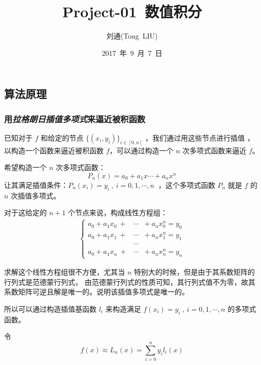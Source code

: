 \documentclass[UTF8, 11pt, a4paper]{ctexart}
\begin{document}
\begin{spacing}{1.5}%

\title{  Project-01~数值积分 } %
\author{刘通(Tong~LIU)} %
\date{2017~年~9~月~7~日} %
\maketitle %
\tableofcontents %
\newpage
\part{算法原理}
\section{用\emph{拉格朗日插值多项式}来逼近被积函数}
已知对于 $ f $ 和给定的节点 $ \{ (x_i,y_i) \}_{i \in [0,n] } $ ，我们通过用这些节点进行插值
，以构造一个函数来逼近被积函数 $ f $，可以通过构造一个 $ n $ 次多项式函数来逼近 $ f $。

希望构造一个 $ n $ 次多项式函数：
$$ P_{n}(x) = a_0 + a_1 x \cdots + a_n x^n  $$
让其满足插值条件：$ P_{n}(x_i) = y_i~,~i=0,1,\cdots,n~$ ，这个多项式函数 $ P_{n} $ 就是
$ f $ 的 $ n $ 次插值多项式。

对于这给定的 $ n+1 $ 个节点来说，构成线性方程组：
\begin{align*}
  \left\{
  \begin{array}{rcl}
a_0 + a_1 x_0 ~+ & \cdots & + ~a_n x_0^n = y_0 \\
a_0 + a_1 x_1 ~+ & \cdots & + ~a_n x_1^n = y_1 \\
                & \cdots & \\
a_0 + a_1 x_n ~+ & \cdots & + ~a_n x_n^n = y_n
  \end{array} \right.
\end{align*}

求解这个线性方程组很不方便，尤其当 $n$ 特别大的时候，但是由于其系数矩阵的行列式是范德蒙行列式，
由范德蒙行列式的性质可知，其行列式值不为零，故其系数矩阵可逆且解是唯一的。说明该插值多项式是唯一的。

所以可以通过构造插值基函数 $ l_i $ 来构造满足 $ f(x_i) = y_i~,~i=0,1,\cdots,n $ 的多项式函数。

令
\begin{equation}
\boxed{ f(x) \approx L_{n}(x) = \sum \limits _{i=0}^{n} y_i l_i(x) }
\label{eq:1}
\end{equation}


\end{spacing}
\end{document}
